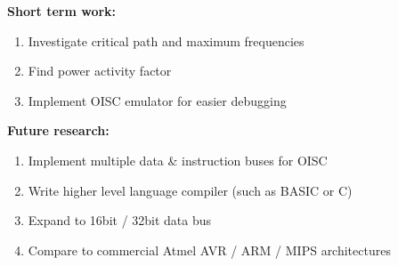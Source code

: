 \documentclass[portrait,color=UCLmidgreen,margin=1.5cm,bannerheight=8cm,logoheight=3.5cm]{uclposter}
\begin{document}
\begin{Row}
\begin{Cell}{2}
\begin{tcolorbox}[title=Future work]
\begin{multicols}{2}
		\textbf{Short term work:}
		\begin{enumerate}
			\item Investigate critical path and maximum frequencies
			\item Find power activity factor
			\item Implement OISC emulator for easier debugging
		\end{enumerate}
		\columnbreak
		\textbf{Future research:}
		\begin{enumerate}
			\item Implement multiple data \& instruction buses for OISC
			\item Write higher level language compiler (such as BASIC or C)
			\item Expand to 16bit / 32bit data bus
			\item Compare to commercial Atmel AVR / ARM / MIPS  architectures
		\end{enumerate}
	\end{multicols}

\end{tcolorbox}
\end{Cell}\end{Row}
\end{document}
